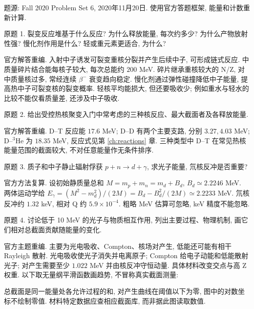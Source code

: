 题源: Fall 2020 Problem Set 6, 2020年11月20日. 使用官方答题框架, 能量和计数重新计算.
\begin{exercise}\label{ex:8701-6-1}
原题 1. 裂变反应堆基于什么反应? 为什么释放能量, 每次约多少? 为什么产物放射性强? 慢化剂作用是什么? 轻或重元素更适合, 为什么?
\end{exercise}
\begin{solution}
官方解答重编. 入射中子诱发可裂变重核分裂并产生后续中子, 可形成链式反应. 中质量碎片结合能每核子较大, 每次总能约 $200$ MeV. 碎片继承重核较大的 N/Z, 对中质量核过多, 常经连续 $\beta^-$ 衰变趋向稳定. 慢化剂通过弹性碰撞降低中子能量, 提高热中子可裂变核的裂变概率. 轻核平均能损大, 但还要吸收少; 例如重水与轻水的比较不能仅看质量差, 还涉及中子吸收.
\end{solution}
\begin{exercise}\label{ex:8701-6-2}
原题 2. 给出受控热核聚变入门中常考虑的三种核反应、最大截面者及各释放能量.
\end{exercise}
\begin{solution}
官方解答重编. D--T 反应能 $17.6$ MeV; D--D 有两个主要支路, 分别 $3.27,4.03$ MeV; D--$^3$He 为 $18.35$ MeV, 反应式见第 \ref{ch:reactions} 章. 三种类型中 D--T 在常见热核能量范围的截面较大, 不对任意能量作无条件排序.
\end{solution}
\begin{exercise}\label{ex:8701-6-3}
原题 3. 质子和中子静止辐射俘获 $p+n\to d+\gamma$, 求光子能量, 氘核反冲是否重要?
\end{exercise}
\begin{solution}
官方方法复算. 设初始静质量总和 $M=m_p+m_n=m_d+B_d$, $B_d\simeq2.2246$ MeV. 两体运动学给 $E_\gamma=(M^2-m_d^2)/(2M)=B_d-B_d^2/(2M)\simeq2.2233$ MeV. 氘核反冲约 $1.32$ keV, 相对 Q 约 $5.9\times10^{-4}$. 粗略 MeV 估算可忽略, keV 精度不能忽略.
\end{solution}
\begin{exercise}\label{ex:8701-6-4}
原题 4. 讨论低于 10 MeV 的光子与物质相互作用, 列出主要过程、物理机制, 画它们相对总截面贡献随能量的变化.
\end{exercise}
\begin{solution}
官方主题重编. 主要为光电吸收、Compton、核场对产生, 低能还可能有相干 Rayleigh 散射. 光电吸收使光子消失并电离原子; Compton 给电子动能和低能散射光子; 对产生需要至少 $1.022$ MeV 并由核反冲守恒动量. 具体材料改变交点与高 Z 权重. 以下取无量纲平滑函数画趋势, 不冒称真实截面测量:
\begin{center}\end{center}
总截面是同一能量处各允许过程的和, 对产生曲线在阈值以下为零, 图中的对数坐标不绘制零值. 材料特定数据应查相应截面库, 而非据此图读取数值.
\end{solution}
